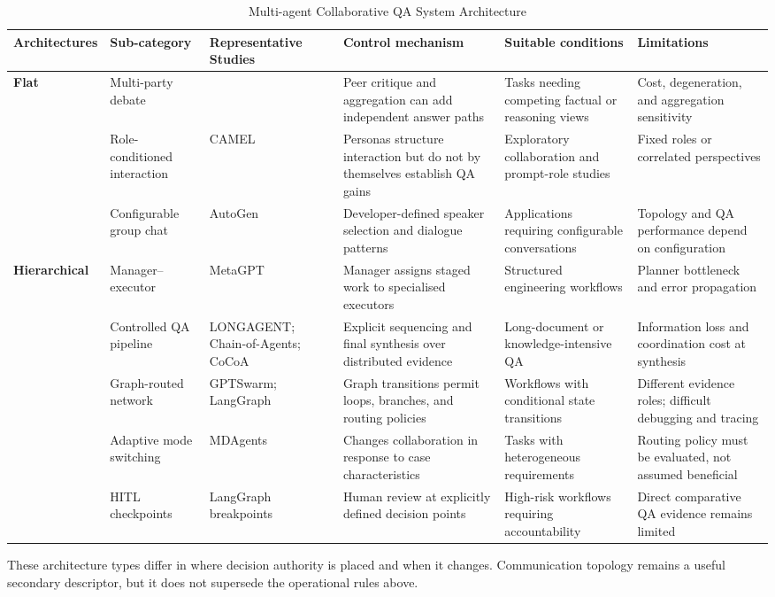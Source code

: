 \begin{table}[pos=t]
  \centering
  \caption{Multi-agent Collaborative QA System Architecture}
  \label{tab:9categories}
  \scriptsize
  \begin{tabular}{p{1.4cm} p{2.0cm} p{2.4cm}  p{3.2cm} p{2.3cm} p{2.2cm}}
    \toprule
    \textbf{Architectures} & \textbf{Sub-category} & \textbf{Representative Studies} &
   \textbf{Control mechanism} &
    \textbf{Suitable conditions} & \textbf{ Limitations} \\
    \midrule
    \multirow{3}{*}{\textbf{Flat}} &
    Multi-party debate & \citet{du2024multiagent_debate} & 
    Peer critique and aggregation can add independent answer paths &
    Tasks needing competing factual or reasoning views &
    Cost, degeneration, and aggregation sensitivity \\
    & Role-conditioned interaction & CAMEL \citep{li2023camel} & 
    Personas structure interaction but do not by themselves establish QA gains &
    Exploratory collaboration and prompt-role studies &
    Fixed roles or correlated perspectives \\
    & Configurable group chat & AutoGen \citep{wu2024autogen}  &
    Developer-defined speaker selection and dialogue patterns &
    Applications requiring configurable conversations &
    Topology and QA performance depend on configuration \\
    \midrule
    \multirow{3}{*}{\textbf{Hierarchical}} &
    Manager--executor & MetaGPT \citep{hong2024metagpt}  &
    Manager assigns staged work to specialised executors &
    Structured engineering workflows &
    Planner bottleneck and error propagation \\
    & Controlled QA pipeline & LONGAGENT; Chain-of-Agents; CoCoA
    \citep{zhao2024longagent,zhang2024chain_agents,jiang2026cocoa}  &
    Explicit sequencing and final synthesis over distributed evidence &
    Long-document or knowledge-intensive QA &
    Information loss and coordination cost at synthesis \\
   
    \midrule
    \multirow{3}{*}{\textbf{Hybrid}} &
    Graph-routed network & GPTSwarm; LangGraph
    \citep{zhuge2024gptswarm,langgraph2024}  &
    Graph transitions permit loops, branches, and routing policies &
    Workflows with conditional state transitions &
    Different evidence roles; difficult debugging and tracing \\
    & Adaptive mode switching & MDAgents \citep{kim2024mdagents}  &
    Changes collaboration in response to case characteristics &
    Tasks with heterogeneous requirements &
    Routing policy must be evaluated, not assumed beneficial \\
    & HITL checkpoints & LangGraph breakpoints \citep{langgraph2024} &
    Human review at explicitly defined decision points &
    High-risk workflows requiring accountability &
    Direct comparative QA evidence remains limited \\
    \bottomrule
  \end{tabular}
\end{table}

These architecture types differ in where decision authority is placed and when it
changes. Communication topology remains a useful secondary descriptor, but it
does not supersede the operational rules above. 
